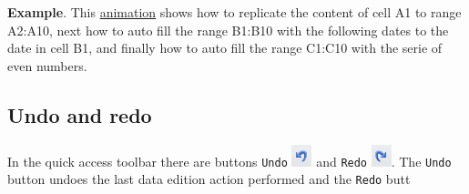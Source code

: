 \textbf{Example}. This \href{http://aprendeconalf.es/office/excel/manual/img/example_autofill.gif}{animation} shows how
to replicate the content of cell A1 to range A2:A10, next how to auto fill the range B1:B10 with the following dates to the date in cell B1, and finally how to auto fill the range C1:C10 with the serie of even numbers.


\subsection{Undo and redo}\hypertarget{undo-and-redo}{}\label{undo-and-redo}

In the quick access toolbar there are buttons \texttt{Undo} \includegraphics[max width=\linewidth]{../img/button_undo.png} and \texttt{Redo} \includegraphics[max width=\linewidth]{../img/button_redo.png}. The \texttt{Undo} button undoes the last data edition action performed and the \texttt{Redo} butt